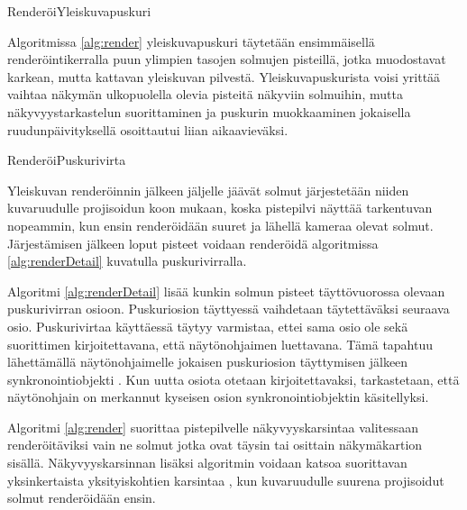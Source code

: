 \begin{algorithm}[!h]
    \caption{RenderöiYleiskuvapuskuri}
    \label{alg:render}
    
\end{algorithm}

Algoritmissa \ref{alg:render} yleiskuvapuskuri täytetään ensimmäisellä renderöintikerralla puun ylimpien tasojen solmujen pisteillä, jotka muodostavat karkean, mutta kattavan yleiskuvan pilvestä. Yleiskuvapuskurista voisi yrittää vaihtaa näkymän ulkopuolella olevia pisteitä näkyviin solmuihin, mutta näkyvyystarkastelun suorittaminen ja puskurin muokkaaminen jokaisella ruudunpäivityksellä osoittautui liian aikaavieväksi. 

\begin{algorithm}[!h]
    \caption{RenderöiPuskurivirta}
    \label{alg:renderDetail}
    
\end{algorithm}

Yleiskuvan renderöinnin jälkeen jäljelle jäävät solmut järjestetään niiden kuvaruudulle projisoidun koon mukaan, koska pistepilvi näyttää tarkentuvan nopeammin, kun ensin renderöidään suuret ja lähellä kameraa olevat solmut. Järjestämisen jälkeen loput pisteet voidaan renderöidä algoritmissa \ref{alg:renderDetail} kuvatulla puskurivirralla. 

Algoritmi \ref{alg:renderDetail} lisää kunkin solmun pisteet täyttövuorossa olevaan puskurivirran osioon. Puskuriosion täyttyessä vaihdetaan täytettäväksi seuraava osio. Puskurivirtaa käyttäessä täytyy varmistaa, ettei sama osio ole sekä suorittimen kirjoitettavana, että näytönohjaimen luettavana. Tämä tapahtuu lähettämällä näytönohjaimelle jokaisen puskuriosion täyttymisen jälkeen synkronointiobjekti . Kun uutta osiota otetaan kirjoitettavaksi, tarkastetaan, että näytönohjain on merkannut kyseisen osion synkronointiobjektin käsitellyksi. \cite{sync}

Algoritmi \ref{alg:render} suorittaa pistepilvelle näkyvyyskarsintaa  valitessaan renderöitäviksi vain ne solmut jotka ovat täysin tai osittain näkymäkartion  sisällä. Näkyvyyskarsinnan lisäksi algoritmin voidaan katsoa suorittavan yksinkertaista yksityiskohtien karsintaa , kun kuvaruudulle suurena projisoidut solmut renderöidään ensin.

